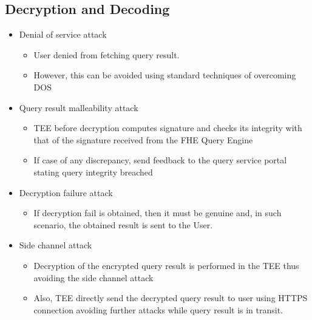 \subsection{Decryption and Decoding}
\begin{itemize}
    \item Denial of service attack
          \begin{itemize}
              \item User denied from fetching query result.
              \item However, this can be avoided using standard techniques of overcoming DOS
          \end{itemize}
    \item Query result malleability attack
          \begin{itemize}
              \item TEE before decryption computes signature and checks its integrity with that of the signature received from the FHE Query Engine
              \item If case of any discrepancy, send feedback to the query service portal stating query integrity breached
          \end{itemize}
    \item Decryption failure attack
          \begin{itemize}
              \item If decryption fail is obtained, then it must be genuine and, in such scenario, the obtained result is sent to the User.
          \end{itemize}
    \item Side channel attack
          \begin{itemize}
              \item Decryption of the encrypted query result is performed in the TEE thus avoiding the side channel attack
              \item Also, TEE directly send the decrypted query result to user using HTTPS connection avoiding further attacks while query result is in transit.
          \end{itemize}
\end{itemize}


